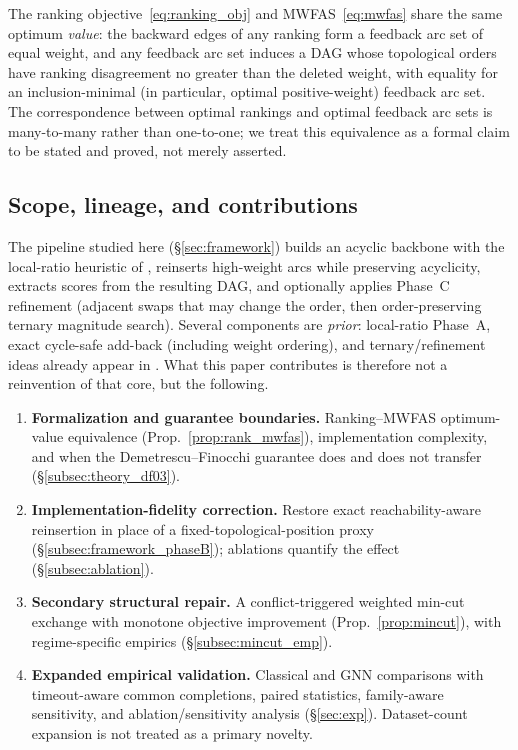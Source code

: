 \documentclass{article}
\begin{document}
The ranking objective~\eqref{eq:ranking_obj} and MWFAS~\eqref{eq:mwfas} share the same optimum \emph{value}: the backward edges of any ranking form a feedback arc set of equal weight, and any feedback arc set induces a DAG whose topological orders have ranking disagreement no greater than the deleted weight, with equality for an inclusion-minimal (in particular, optimal positive-weight) feedback arc set. The correspondence between optimal rankings and optimal feedback arc sets is many-to-many rather than one-to-one; we treat this equivalence as a formal claim to be stated and proved, not merely asserted.

\subsection{Scope, lineage, and contributions}
The pipeline studied here (\S\ref{sec:framework}) builds an acyclic backbone with the local-ratio heuristic of \citet{CI03}, reinserts high-weight arcs while preserving acyclicity, extracts scores from the resulting DAG, and optionally applies Phase~C refinement (adjacent swaps that may change the order, then order-preserving ternary magnitude search). Several components are \emph{prior}: local-ratio Phase~A, exact cycle-safe add-back (including weight ordering), and ternary/refinement ideas already appear in \citet{CI03,VK25}. What this paper contributes is therefore not a reinvention of that core, but the following.

\begin{enumerate}
\item \textbf{Formalization and guarantee boundaries.}
Ranking--MWFAS optimum-value equivalence (Prop.~\ref{prop:rank_mwfas}), implementation complexity, and when the Demetrescu--Finocchi guarantee does and does not transfer (\S\ref{subsec:theory_df03}).
\item \textbf{Implementation-fidelity correction.}
Restore exact reachability-aware reinsertion in place of a fixed-topological-position proxy (\S\ref{subsec:framework_phaseB}); ablations quantify the effect (\S\ref{subsec:ablation}).
\item \textbf{Secondary structural repair.}
A conflict-triggered weighted min-cut exchange with monotone objective improvement (Prop.~\ref{prop:mincut}), with regime-specific empirics (\S\ref{subsec:mincut_emp}).
\item \textbf{Expanded empirical validation.}
Classical and GNN comparisons with timeout-aware common completions, paired statistics, family-aware sensitivity, and ablation/sensitivity analysis (\S\ref{sec:exp}). Dataset-count expansion is not treated as a primary novelty.
\end{enumerate}
\end{document}
